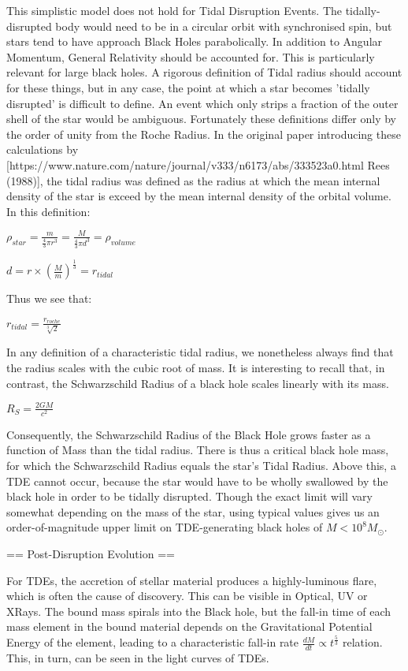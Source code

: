 \documentclass[]{article}
\begin{document}
This simplistic model does not hold for Tidal Disruption Events. The tidally-disrupted body would need to be in a circular orbit with synchronised spin, but stars tend to have approach Black Holes parabolically. In addition to Angular Momentum, General Relativity should be accounted for. This is particularly relevant for large black holes. A rigorous definition of Tidal radius should account for these things, but in any case, the point at which a star becomes 'tidally disrupted' is difficult to define. An event which only strips a fraction of the outer shell of the star would be ambiguous. Fortunately these definitions differ only by the order of unity from the Roche Radius. In the original paper introducing these calculations by [https://www.nature.com/nature/journal/v333/n6173/abs/333523a0.html Rees (1988)], the tidal radius was defined as the radius at which the mean internal density of the star is exceed by the mean internal density of the orbital volume. In this definition:

$\rho_{star} = \frac{m}{\frac{4}{3} \pi r ^{3}}  = \frac{M}{\frac{4}{3} \pi d ^{3}}= \rho_{volume}$

$ d = r \times (\frac{M}{m})^{\frac{1}{3}} = r_{tidal} $

Thus we see that:

$ r_{tidal} = \frac{r_{roche}}{\sqrt[3]{2}} $

In any definition of a characteristic tidal radius, we nonetheless always find that the radius scales with the cubic root of mass. It is interesting to recall that, in contrast, the Schwarzschild Radius of a black hole scales linearly with its mass. 

$R_{S} = \frac{2GM}{c^{2}}$

Consequently, the Schwarzschild Radius of the Black Hole grows faster as a function of Mass than the tidal radius. There is thus a critical black hole mass, for which the Schwarzschild Radius equals the star's Tidal Radius. Above this, a TDE cannot occur, because the star would have to be wholly swallowed by the black hole in order to be tidally disrupted. Though the exact limit will vary somewhat depending on the mass of the star, using typical values gives us an order-of-magnitude upper limit on TDE-generating black holes of $M < 10^{8} M_{\odot}$.

== Post-Disruption Evolution ==

For TDEs, the accretion of stellar material produces a highly-luminous flare, which is often the cause of discovery. This can be visible in Optical, UV or XRays. The bound mass spirals into the Black hole, but the fall-in time of each mass element in the bound material depends on the Gravitational Potential Energy of the element, leading to a characteristic fall-in rate $ \frac{dM}{dt} \propto t^{\frac{5}{3}}$ relation. This, in turn, can be seen in the light curves of TDEs.
\end{document}

